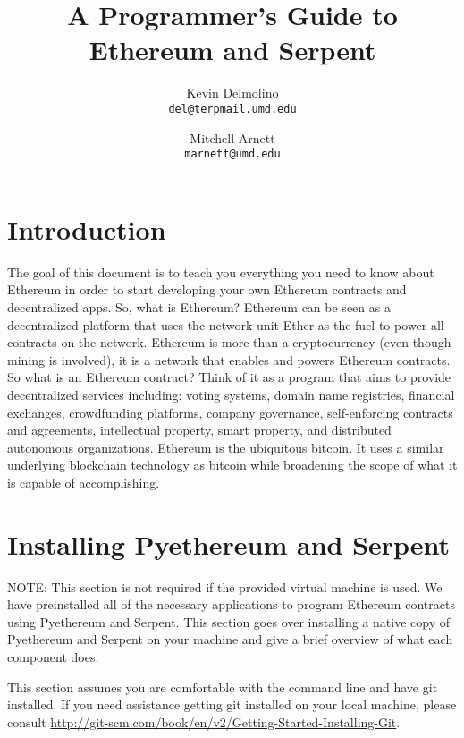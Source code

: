 \documentclass[12pt]{article}
\begin{document}
\title{A Programmer's Guide to Ethereum and Serpent}

\author{
  Kevin Delmolino\\
  \texttt{del@terpmail.umd.edu}
  \and
  Mitchell Arnett\\
  \texttt{marnett@umd.edu}
}

\maketitle

\setcounter{tocdepth}{5}
\tableofcontents

\section{Introduction}
The goal of this document is to teach you everything you need to know about Ethereum in order to start developing your own Ethereum contracts and decentralized apps. So, what is Ethereum? Ethereum can be seen as a decentralized platform that uses the network unit Ether as the fuel to power all contracts on the network. Ethereum is more than a cryptocurrency (even though mining is involved), it is a network that enables and powers Ethereum contracts. So what is an Ethereum contract? Think of it as a program that aims to provide decentralized services including: voting systems, domain name registries, financial exchanges, crowdfunding platforms, company governance, self-enforcing contracts and agreements, intellectual property, smart property, and distributed autonomous organizations. Ethereum is the ubiquitous bitcoin. It uses a similar underlying blockchain technology as bitcoin while broadening the scope of what it is capable of accomplishing. 

\section{Installing Pyethereum and Serpent}
\begin{framed}
NOTE: This section is not required if the provided virtual machine is used. We have preinstalled all of the necessary applications to program Ethereum contracts using Pyethereum and Serpent. This section goes over installing a native copy of Pyethereum and Serpent on your machine and give a brief overview of what each component does.
\end{framed}

This section assumes you are comfortable with the command line and have git installed. If you need assistance getting git installed on your local machine, please consult \url{http://git-scm.com/book/en/v2/Getting-Started-Installing-Git}.
\end{document}
